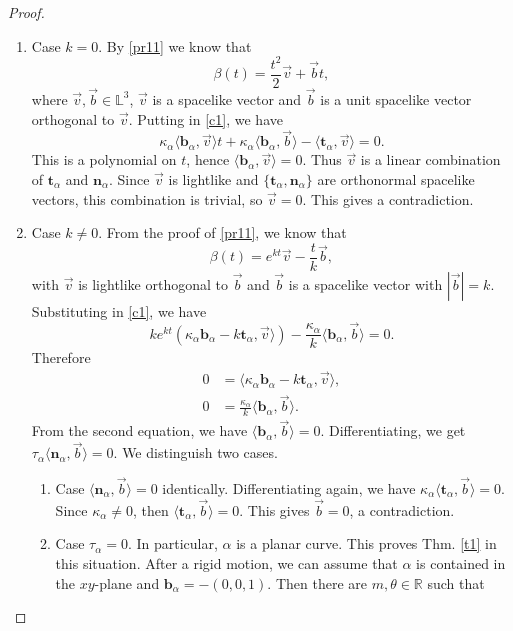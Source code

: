 \documentclass[10pt,a4paper]{amsart}
\def\b{\mathbf b}
\def\n{\mathbf n}
\def\rr{\mathbb L}
\def\r{\mathbb R}
\def\t{\mathbf t}
\begin{document}
\begin{proof}
\begin{enumerate}
\item Case $k=0$. By  \eqref{pr11} we know that 
$$\beta(t)=\frac{t^2}{2}\vec{v}+\vec{b}t,$$
where $\vec{v},\vec{b}\in\rr^3$,  $\vec{v}$ is a spacelike vector and $\vec{b}$ is a unit spacelike vector orthogonal to $\vec{v}$.   Putting in \eqref{c1}, we have 
\begin{equation}\label{c8}
\kappa_\alpha\langle\b_\alpha,\vec{v}\rangle t+\kappa_\alpha\langle\b_\alpha,\vec{b}\rangle-\langle\t_\alpha,\vec{v}\rangle=0.
\end{equation}
This is a polynomial on $t$, hence $\langle\b_\alpha,\vec{v}\rangle=0$. Thus $\vec{v}$ is a linear combination of $\t_\alpha$ and $\n_\alpha$. Since $\vec{v}$ is lightlike and $\{\t_\alpha,\n_\alpha\}$ are orthonormal spacelike vectors, this combination is trivial, so $\vec{v}=0$. This gives a contradiction.
\item Case $k\not=0$. From the proof of   \eqref{pr11}, we know that 
\begin{equation}\label{c12}
\beta(t)=e^{kt}\vec{v}-\frac{t}{k}\vec{b},
\end{equation}
with $\vec{v}$  is lightlike orthogonal to $\vec{b}$ and $\vec{b}$ is a spacelike vector with $|\vec{b}|=k$. 
Substituting in \eqref{c1},  we have 
$$k e^{kt}\left(\kappa_\alpha \b_\alpha -k \t_\alpha,\vec{v}\rangle\right)-\frac{\kappa_\alpha}{k}\langle\b_\alpha,\vec{b}\rangle=0.$$
Therefore
\begin{equation}\label{c9}
\begin{split}
0&= \langle \kappa_\alpha \b_\alpha-k\t_\alpha,\vec{v}\rangle,\\
0&=\frac{\kappa_\alpha}{k}\langle\b_\alpha,\vec{b}\rangle.
\end{split}
\end{equation}
From the second equation, we have $\langle\b_\alpha,\vec{b}\rangle=0$. Differentiating, we get  $\tau_\alpha\langle\n_\alpha,\vec{b}\rangle=0$. We distinguish two cases.
\begin{enumerate}
\item Case $\langle\n_\alpha,\vec{b}\rangle=0$ identically. Differentiating again, we have $\kappa_\alpha\langle\t_\alpha,\vec{b}\rangle=0$. Since $\kappa_\alpha\not=0$, then $\langle \t_\alpha,\vec{b}\rangle=0$. This gives $\vec{b}=0$, a contradiction. 
\item Case $\tau_\alpha=0$.   In particular, $\alpha$ is a planar curve. This proves Thm. \ref{t1} in this situation. After a rigid motion, we can assume that $\alpha$ is contained in the $xy$-plane and  $\b_\alpha=-(0,0,1)$. Then there are $m,\theta\in\r$ such that

\end{enumerate}
\end{enumerate}
\end{proof}
\end{document}
